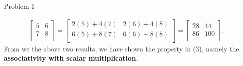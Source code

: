 \begin{problem}{Problem 1}
\begin{highlight}[Solution]
\begin{align*}
            \begin{bmatrix}
                5 & 6 \\
                7 & 8 \\
            \end{bmatrix}
            = 
            \begin{bmatrix}
                2(5) + 4(7) & 2(6) + 4(8) \\
                6(5) + 8(7) & 6(6) + 8(8) \\
            \end{bmatrix}
            = 
            \begin{bmatrix}
                28 & 44 \\
                86 & 100 \\
            \end{bmatrix}.
        \end{align*}
        From we the above two results, we have shown the property in (3), namely the \textbf{associativity with scalar multiplication}.


\end{highlight}
\end{problem}
